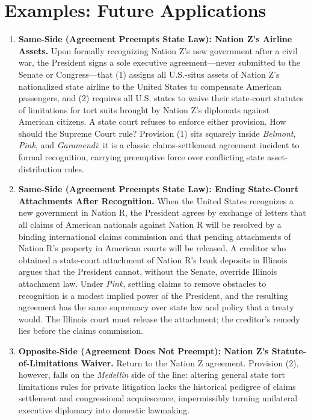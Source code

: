 \documentclass[12pt]{article}
\begin{document}
\section{Examples: Future Applications}
\begin{enumerate}

\item \textbf{Same-Side (Agreement Preempts State Law): Nation Z's Airline Assets.} Upon formally recognizing Nation Z's new government after a civil war, the President signs a sole executive agreement---never submitted to the Senate or Congress---that (1) assigns all U.S.-situs assets of Nation Z's nationalized state airline to the United States to compensate American passengers, and (2) requires all U.S. states to waive their state-court statutes of limitations for tort suits brought by Nation Z's diplomats against American citizens. A state court refuses to enforce either provision. How should the Supreme Court rule? Provision (1) sits squarely inside \textit{Belmont}, \textit{Pink}, and \textit{Garamendi}: it is a classic claims-settlement agreement incident to formal recognition, carrying preemptive force over conflicting state asset-distribution rules.

\item \textbf{Same-Side (Agreement Preempts State Law): Ending State-Court Attachments After Recognition.} When the United States recognizes a new government in Nation R, the President agrees by exchange of letters that all claims of American nationals against Nation R will be resolved by a binding international claims commission and that pending attachments of Nation R's property in American courts will be released. A creditor who obtained a state-court attachment of Nation R's bank deposits in Illinois argues that the President cannot, without the Senate, override Illinois attachment law. Under \textit{Pink}, settling claims to remove obstacles to recognition is a modest implied power of the President, and the resulting agreement has the same supremacy over state law and policy that a treaty would. The Illinois court must release the attachment; the creditor's remedy lies before the claims commission.

\item \textbf{Opposite-Side (Agreement Does Not Preempt): Nation Z's Statute-of-Limitations Waiver.} Return to the Nation Z agreement. Provision (2), however, falls on the \textit{Medell\'in} side of the line: altering general state tort limitations rules for private litigation lacks the historical pedigree of claims settlement and congressional acquiescence, impermissibly turning unilateral executive diplomacy into domestic lawmaking.


\end{enumerate}
\end{document}

